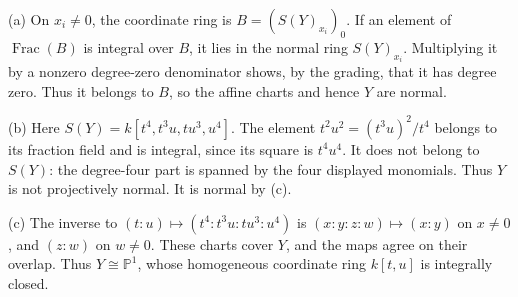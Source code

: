 (a) On $x_i\ne0$, the coordinate ring is $B=(S(Y)_{x_i})_0$. If an element of $\operatorname{Frac}(B)$ is integral over $B$, it lies in the normal ring $S(Y)_{x_i}$. Multiplying it by a nonzero degree-zero denominator shows, by the grading, that it has degree zero. Thus it belongs to $B$, so the affine charts and hence $Y$ are normal.

(b) Here $S(Y)=k[t^4,t^3u,tu^3,u^4]$. The element $t^2u^2=(t^3u)^2/t^4$ belongs to its fraction field and is integral, since its square is $t^4u^4$. It does not belong to $S(Y)$: the degree-four part is spanned by the four displayed monomials. Thus $Y$ is not projectively normal. It is normal by (c).

(c) The inverse to $(t:u)\mapsto(t^4:t^3u:tu^3:u^4)$ is $(x:y:z:w)\mapsto(x:y)$ on $x\ne0$, and $(z:w)$ on $w\ne0$. These charts cover $Y$, and the maps agree on their overlap. Thus $Y\cong\mathbb P^1$, whose homogeneous coordinate ring $k[t,u]$ is integrally closed.
